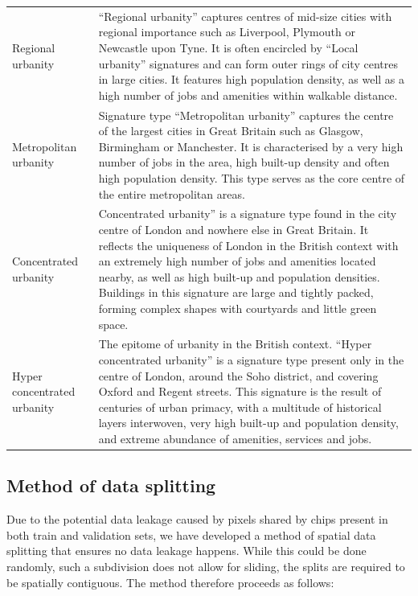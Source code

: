 \begin{longtable}{p{}p{}}
    Regional urbanity                    &                                                             “Regional urbanity” captures centres of mid-size cities with regional importance such as Liverpool, Plymouth or Newcastle upon Tyne. It is often encircled by “Local urbanity” signatures and can form outer rings of city centres in large cities. It features high population density, as well as a high number of jobs and amenities within walkable distance. \\
    Metropolitan urbanity                &                                                                                    Signature type “Metropolitan urbanity” captures the centre of the largest cities in Great Britain such as Glasgow, Birmingham or Manchester. It is characterised by a very high number of jobs in the area, high built-up density and often high population density. This type serves as the core centre of the entire metropolitan areas. \\
    Concentrated urbanity                &  Concentrated urbanity” is a signature type found in the city centre of London and nowhere else in Great Britain. It reflects the uniqueness of London in the British context with an extremely high number of jobs and amenities located nearby, as well as high built-up and population densities. Buildings in this signature are large and tightly packed, forming complex shapes with courtyards and little green space. \\
    Hyper concentrated urbanity          &     The epitome of urbanity in the British context. “Hyper concentrated urbanity” is a signature type present only in the centre of London, around the Soho district, and covering Oxford and Regent streets. This signature is the result of centuries of urban primacy, with a multitude of historical layers interwoven, very high built-up and population density, and extreme abundance of amenities, services and jobs. \\
    \bottomrule
\end{longtable}


\subsection{Method of data splitting}
\label{sec:appendixF}

Due to the potential data leakage caused by pixels shared by chips present in both
train and validation sets, we have developed a method of spatial data splitting that
ensures no data leakage happens. While this could be done randomly, such a subdivision
does not allow for sliding, the splits are required to be spatially contiguous. The
method therefore proceeds as follows:

